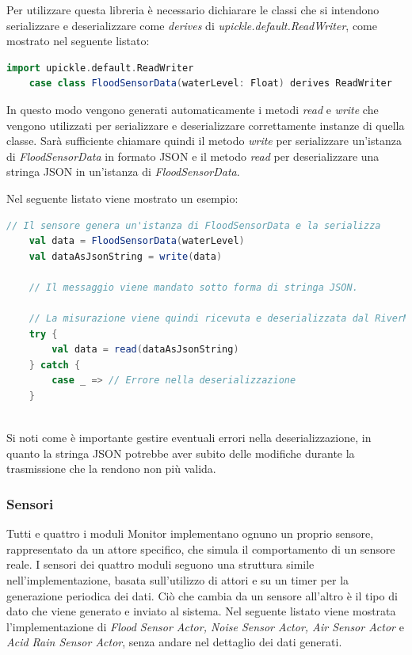 \documentclass{scrartcl}
\begin{document}
Per utilizzare questa libreria è necessario dichiarare le classi che si intendono serializzare e deserializzare come \textit{derives} di \textit{upickle.default.ReadWriter}, come mostrato nel seguente listato:
\begin{lstlisting}[language=Scala]
    import upickle.default.ReadWriter
    case class FloodSensorData(waterLevel: Float) derives ReadWriter
\end{lstlisting}
In questo modo vengono generati automaticamente i metodi \textit{read} e \textit{write} che vengono utilizzati per serializzare e deserializzare correttamente instanze di quella classe. Sarà sufficiente chiamare quindi il metodo \textit{write} per serializzare un'istanza di \textit{FloodSensorData} in formato JSON e il metodo \textit{read} per deserializzare una stringa JSON in un'istanza di \textit{FloodSensorData}.

Nel seguente listato viene mostrato un esempio:
\begin{lstlisting}[language=Scala]
    // Il sensore genera un'istanza di FloodSensorData e la serializza
    val data = FloodSensorData(waterLevel)
    val dataAsJsonString = write(data)

    // Il messaggio viene mandato sotto forma di stringa JSON.

    // La misurazione viene quindi ricevuta e deserializzata dal RiverMonitor
    try {
        val data = read(dataAsJsonString)
    } catch {
        case _ => // Errore nella deserializzazione
    }
    
\end{lstlisting}
Si noti come è importante gestire eventuali errori nella deserializzazione, in quanto la stringa JSON potrebbe aver subito delle modifiche durante la trasmissione che la rendono non più valida.

\subsubsection{Sensori}
Tutti e quattro i moduli Monitor implementano ognuno un proprio sensore, rappresentato da un attore specifico, che simula il comportamento di un sensore reale. I sensori dei quattro moduli seguono una struttura simile nell'implementazione, basata sull'utilizzo di attori e su un timer per la generazione periodica dei dati. Ciò che cambia da un sensore all'altro è il tipo di dato che viene generato e inviato al sistema.
Nel seguente listato viene mostrata l'implementazione di \textit{Flood Sensor Actor,
    Noise Sensor Actor, Air Sensor Actor} e \textit{Acid Rain Sensor Actor}, senza andare nel dettaglio dei dati generati.
\end{document}
